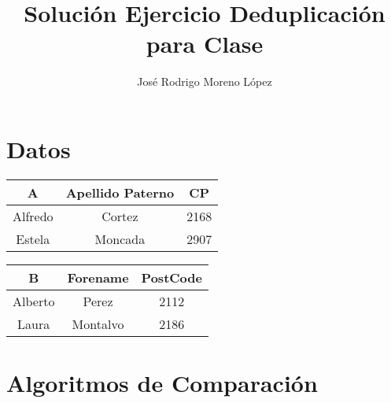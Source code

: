 \documentclass{article}
\title{Solución Ejercicio Deduplicación para Clase}
\author{José Rodrigo Moreno López}
\date{}
\begin{document}
\maketitle

\section*{Datos}

\begin{tabular}{|c|c|c|}
\hline
\textbf{A} & Apellido Paterno & CP \\
\hline
Alfredo & Cortez & 2168 \\
Estela & Moncada & 2907 \\
\hline
\end{tabular}
\hspace{1cm}
\begin{tabular}{|c|c|c|}
\hline
\textbf{B} & Forename & PostCode \\
\hline
Alberto & Perez & 2112 \\
Laura & Montalvo & 2186 \\
\hline
\end{tabular}

\vspace{1em}

\section*{Algoritmos de Comparación}
\end{document}
